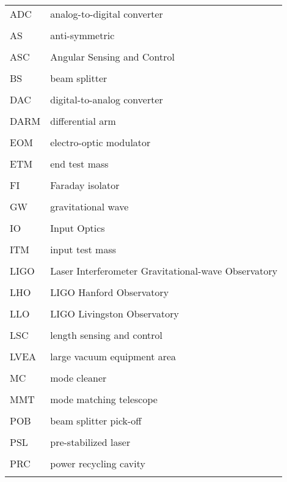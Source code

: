 \singlespacing
\begin{tabular}{lp{5in}}
ADC & analog-to-digital converter \\
\\
AS & anti-symmetric \\
\\
ASC & Angular Sensing and Control \\
\\
BS & beam splitter \\
\\
DAC & digital-to-analog converter\\
\\
DARM & differential arm \\
\\
EOM & electro-optic modulator \\
\\
ETM & end test mass \\
\\
FI & Faraday isolator \\
\\
GW & gravitational wave \\
\\
IO & Input Optics \\
\\
ITM & input test mass \\
\\
LIGO & Laser Interferometer Gravitational-wave Observatory \\
\\
LHO & LIGO Hanford Observatory \\
\\
LLO & LIGO Livingston Observatory \\
\\
LSC & length sensing and control \\
\\
LVEA & large vacuum equipment area \\
\\
MC & mode cleaner \\
\\
MMT & mode matching telescope \\
\\
POB & beam splitter pick-off \\
\\
PSL & pre-stabilized laser \\
\\
PRC & power recycling cavity \\
\\
\end{tabular}
\doublespacing




